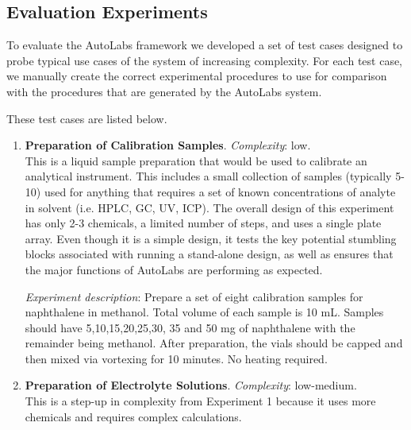 \documentclass[sn-nature, twocolumn]{sn-jnl}%
\theoremstyle{thmstyleone}%
\theoremstyle{thmstyletwo}%
\theoremstyle{thmstylethree}%
\begin{document}
\subsection{Evaluation Experiments}
To evaluate the AutoLabs framework we developed a set of test cases designed to probe typical use cases of the system of increasing complexity. For each test case, we manually create the correct experimental procedures to use for comparison with the procedures that are generated by the AutoLabs system.

These test cases are listed below.

\begin{enumerate}
    \item \textbf{Preparation of Calibration Samples}. \textit{Complexity}: low.\\
    This is a liquid sample preparation that would be used to calibrate an analytical instrument. This includes a small collection of samples (typically 5-10) used for anything that requires a set of known concentrations of analyte in solvent (i.e. HPLC, GC, UV, ICP). The overall design of this experiment has only 2-3 chemicals, a limited number of steps, and uses a single plate array. Even though it is a simple design, it tests the key potential stumbling blocks associated with running a stand-alone design, as well as ensures that the major functions of AutoLabs are performing as expected. 
        
    \textit{Experiment description}: Prepare a set of eight calibration samples for naphthalene in methanol. Total volume of each sample is 10 mL. Samples should have 5,10,15,20,25,30, 35 and 50 mg of naphthalene with the remainder being methanol. After preparation, the vials should be capped and then mixed via vortexing for 10 minutes. No heating required.\\

    \item \textbf{Preparation of Electrolyte Solutions}. \textit{Complexity}: low-medium.\\
    This is a step-up in complexity from Experiment 1 because it uses more chemicals and requires complex calculations. 


\end{enumerate}
\end{document}
